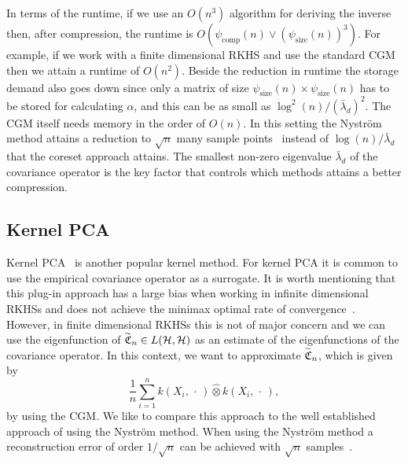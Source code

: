 \documentclass[AHL,Unicode,longabstracts,published]{cedram}
\theoremstyle{remark}
\newcommand{\compp}{\mathrm{comp}}
\newcommand{\ssize}{\mathrm{size}}
\newcommand{\cH}{\mathcal{H}}
\newcommand{\fkC}{\mathfrak{C}}
\newcommand{\wh}{\widehat}
\let\oldtilde\tilde
\renewcommand*{\tilde}[1]{\mathchoice{\widetilde{#1}}{\widetilde{#1}}{\oldtilde{#1}}{\oldtilde{#1}}}
\begin{document}
In terms of the runtime, if we use an $O(n^3)$ algorithm for deriving the inverse then, after compression, the runtime is $O(\psi_{\compp}(n) \vee (\psi_{\ssize}(n))^3)$. For example, if we work with a finite dimensional RKHS and use the standard CGM then we attain a runtime of $O(n^2)$. Beside the reduction in runtime the storage demand also goes down since only a matrix of size $\psi_{\ssize}(n) \times \psi_{\ssize}(n)$ has to be stored for calculating $\alpha$, and this can be as small as $\log^2(n) /(\bar \lambda_d)^2$. The CGM itself needs memory in the order of $O(n)$. In this setting the Nystr\"om method attains a reduction to $\sqrt{n}$ many sample points~\cite[Theorem~3.9]{LI23} instead of $\log(n)/\bar \lambda_d$ that the coreset approach attains. The smallest non-zero eigenvalue $\bar \lambda_d$ of the covariance operator is the key factor that controls which methods attains a better compression.

\subsection{Kernel PCA}

Kernel PCA~\cite{SCH97,BLAN07} is another popular kernel method. For kernel PCA it is common to use the empirical covariance operator as a surrogate. It is worth mentioning that this plug-in approach has a large bias when working in infinite dimensional RKHSs and does not achieve the minimax optimal rate of convergence~\cite{KOLT18}. However, in finite dimensional RKHSs this is not of major concern and we can use the eigenfunction of $\tilde{\fkC}_n \in L(\cH,\cH)$ as an estimate of the eigenfunctions of the covariance operator. In this context, we want to approximate $\tilde{\fkC}_n$, which is given by
\[
\frac{1}{n} \sum_{i=1}^n k(X_i,\,\cdot\,) \wh{\otimes} k(X_i,\,\cdot\,),
\]
by using the CGM. We like to compare this approach to the well established approach of using the Nystr\"om method. When using the Nystr\"om method a reconstruction error of order $1/\sqrt{n}$ can be achieved with $\sqrt{n}$ samples~\cite[Corollary~3]{STER20}.
\end{document}
